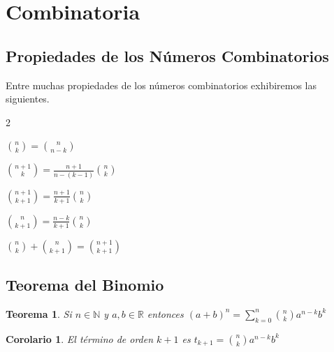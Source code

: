 \documentclass[12pt,twoside]{article}
\newtheorem{Teo}{Teorema}
\newtheorem{Cor}{Corolario}
\begin{document}
\newpage

\section{Combinatoria}


\subsection{Propiedades de los N\'umeros Combinatorios}

Entre muchas propiedades de los n\'umeros combinatorios
exhibiremos las siguientes.

\begin{enumerate}
\begin{multicols}{2}
\item $\binom{n}{k}=\binom{n}{n-k}$

\item $\binom{n+1}{k}=\frac{n+1}{n-(k-1)}\binom{n}{k}$

\item $\binom{n+1}{k+1}=\frac{n+1}{k+1}\binom{n}{k}$

\item $\binom{n}{k+1}=\frac{n-k}{k+1}\binom{n}{k}$

\item $\binom{n}{k}+\binom{n}{k+1}=\binom{n+1}{k+1}$
\end{multicols}
\end{enumerate}

\subsection{Teorema del Binomio}

\begin{Teo}
Si $n\in\mathbb{N}$ y $a,b\in\mathbb{R}$ entonces $(a+b)^n=\sum_{k=0}^{n}\binom{n}{k}a^{n-k}b^k$
\end{Teo}

\begin{Cor}
El t\'ermino de orden $k+1$ es $t_{k+1}=\binom{n}{k}a^{n-k}b^k$
\end{Cor}
\end{document}

